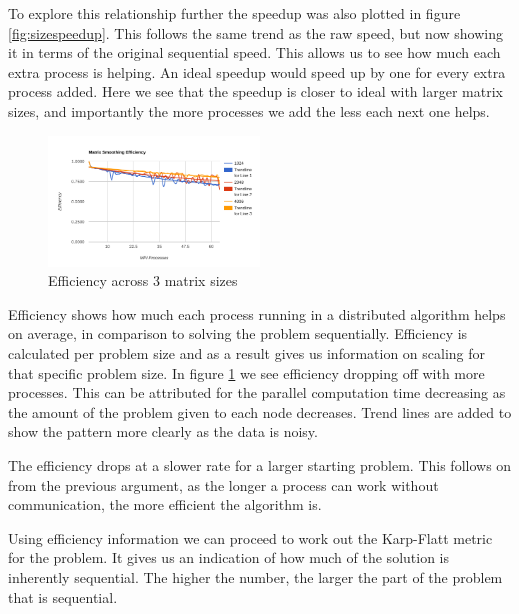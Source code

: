 \documentclass[a4paper,10pt]{report}
\begin{document}
To explore this relationship further the speedup was also plotted in figure \ref{fig:sizespeedup}. This follows the same trend as the raw speed, but now showing it in terms of the original sequential speed. This allows us to see how much each extra process is helping. An ideal speedup would speed up by one for every extra process added. Here we see that the speedup is closer to ideal with larger matrix sizes, and importantly the more processes we add the less each next one helps.

\begin{figure}
 \centering
 \includegraphics[width=0.5\textwidth]{./images/sizes-efficiency.png}
 \caption{Efficiency across 3 matrix sizes}
 \label{fig:sizesefficiency}
\end{figure}

Efficiency shows how much each process running in a distributed algorithm helps on average, in comparison to solving the problem sequentially. Efficiency is calculated per problem size and as a result gives us information on scaling for that specific problem size. In figure \ref{fig:sizesefficiency} we see efficiency dropping off with more processes. This can be attributed for the parallel computation time decreasing as the amount of the problem given to each node decreases. Trend lines are added to show the pattern more clearly as the data is noisy.

The efficiency drops at a slower rate for a larger starting problem. This follows on from the previous argument, as the longer a process can work without communication, the more efficient the algorithm is.

Using efficiency information we can proceed to work out the Karp-Flatt metric for the problem. It gives us an indication of how much of the solution is inherently sequential. The higher the number, the larger the part of the problem that is sequential.
\end{document}
